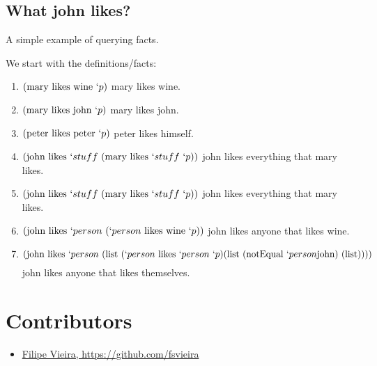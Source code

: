 \documentclass[11pt,a4paper]{report}
\newcommand{\var}[1]{`#1}
\begin{document}
\subsection{What john likes?}

A simple example of querying facts.

We start with the definitions/facts:
\begin{enumerate}

\item $(\text{mary}\ \text{likes}\ \text{wine}\ \var{p})$
\subitem mary likes wine.

\item $(\text{mary}\ \text{likes}\ \text{john}\ \var{p})$
\subitem mary likes john.

\item $(\text{peter}\ \text{likes}\ \text{peter}\ \var{p})$
\subitem peter likes himself.

\item $(\text{john}\ \text{likes}\ \var{stuff}\ (\text{mary}\ \text{likes}\ \var{stuff}\ \var{p}))$
\subitem john likes everything that mary likes.

\item $(\text{john}\ \text{likes}\ \var{stuff}\ (\text{mary}\ \text{likes}\ \var{stuff}\ \var{p}))$
\subitem john likes everything that mary likes.

\item $(\text{john}\ \text{likes}\ \var{person}\ (\var{person}\ \text{likes}\ \text{wine}\ \var{p}))$
\subitem john likes anyone that likes wine.

\item \[
    (\text{john}\ \text{likes}\ \var{person}\ (\text{list}\ (\var{person}\ \text{likes}\ \var{person}\ \var{p}) (\text{list}\ (\text{notEqual}\ \var{person} \text{john})\ (\text{list}))))
\]
\subitem john likes anyone that likes themselves.

\end{enumerate}


\section{Contributors}
\label{sec:contributors}

\begin{itemize}
    \item \href{https://github.com/fsvieira}{Filipe Vieira, https://github.com/fsvieira}
\end{itemize}
\end{document}
